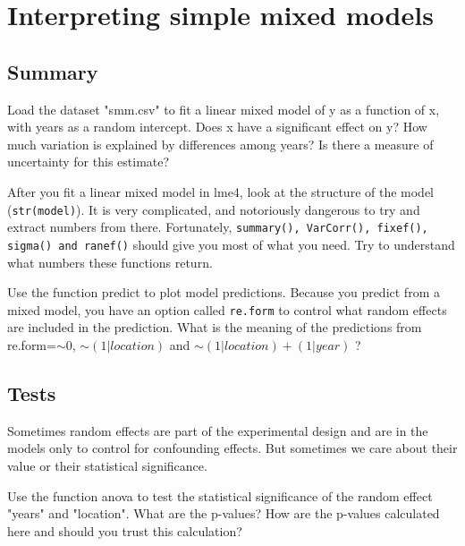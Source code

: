 \documentclass[12pt,a4paper]{scrartcl}\usepackage[]{graphicx}\usepackage[]{color}
\begin{document}
\section{Interpreting simple mixed models}

\subsection{Summary}




\begin{Exercise}[difficulty=1, title={Reading a summary in lme4}]
Load the dataset "smm.csv" to fit a linear mixed model of y as a function of x, with years as a random intercept. 
Does x have a significant effect on y?
How much variation is explained by differences among years? Is there a measure of uncertainty for this estimate?
\end{Exercise}

\begin{Exercise}[difficulty=1, title={Extracting the right number}]
After you fit a linear mixed model in lme4, look at the structure of the model (\texttt{str(model)}). It is very complicated, and notoriously dangerous to try and extract numbers from there. Fortunately, \texttt{summary(), VarCorr(), fixef(), sigma() and ranef()} should give you most of what you need. Try to understand what numbers these functions return.
\end{Exercise}

\begin{Exercise}[difficulty=2, title={Prediction}]
Use the function predict to plot model predictions. Because you predict from a mixed model, you have an option called \texttt{re.form} to control what random effects are included in the prediction. What is the meaning of the predictions from re.form=$\sim 0$, $\sim(1|location)$ and $\sim (1|location) + (1|year)$ ?
\end{Exercise}


\subsection{Tests}
Sometimes random effects are part of the experimental design and are in the models only to control for confounding effects. But sometimes we care about their value or their statistical significance.

\begin{Exercise}[difficulty=2, title={Testing variance components in lme4}]
Use the function anova to test the statistical significance of the random effect "years" and "location". What are the p-values?
How are the p-values calculated here and should you trust this calculation?
\end{Exercise}
\end{document}
